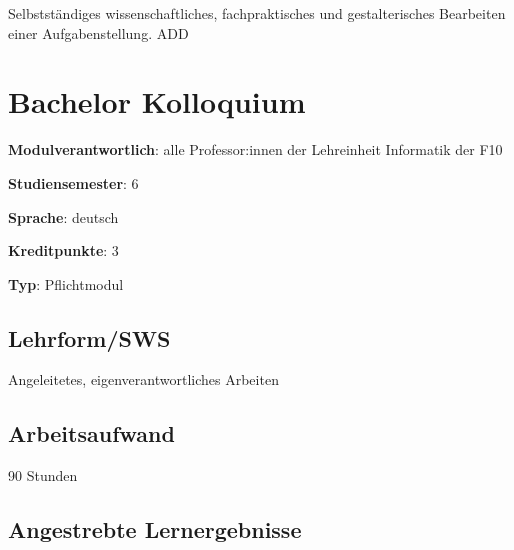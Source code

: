 Selbstständiges wissenschaftliches, fachpraktisches und gestalterisches
Bearbeiten einer Aufgabenstellung. ADD

\hypertarget{bachelor-kolloquiumpathlabelmi-2017modulbeschreibungen-bachelorba_bachelorkolloquium}{%
\chapter{Bachelor
Kolloquium\label{/mi-2017/modulbeschreibungen-bachelor/BA_Bachelorkolloquium}}\label{bachelor-kolloquiumpathlabelmi-2017modulbeschreibungen-bachelorba_bachelorkolloquium}}

\begin{modulHead}
\textbf{Modulverantwortlich}: alle Professor:innen
der Lehreinheit Informatik der
F10
\end{modulHead}
\begin{modulHead}
\textbf{Studiensemester}:
6
\end{modulHead}
\begin{modulHead}
\textbf{Sprache}:
deutsch
\end{modulHead}
\begin{modulHead}
\textbf{Kreditpunkte}:
3
\end{modulHead}
\begin{modulHead}
\textbf{Typ}:
Pflichtmodul
\end{modulHead}


\hypertarget{lehrformswspathlabelmi-2017modulbeschreibungen-bachelorba_bachelorkolloquium}{%
\section*{Lehrform/SWS\label{/mi-2017/modulbeschreibungen-bachelor/BA_Bachelorkolloquium}}\label{lehrformswspathlabelmi-2017modulbeschreibungen-bachelorba_bachelorkolloquium}}

Angeleitetes, eigenverantwortliches Arbeiten

\hypertarget{arbeitsaufwandpathlabelmi-2017modulbeschreibungen-bachelorba_bachelorkolloquium}{%
\section*{Arbeitsaufwand\label{/mi-2017/modulbeschreibungen-bachelor/BA_Bachelorkolloquium}}\label{arbeitsaufwandpathlabelmi-2017modulbeschreibungen-bachelorba_bachelorkolloquium}}

90 Stunden

\hypertarget{angestrebte-lernergebnissepathlabelmi-2017modulbeschreibungen-bachelorba_bachelorkolloquium}{%
\section*{Angestrebte
Lernergebnisse\label{/mi-2017/modulbeschreibungen-bachelor/BA_Bachelorkolloquium}}\label{angestrebte-lernergebnissepathlabelmi-2017modulbeschreibungen-bachelorba_bachelorkolloquium}}

